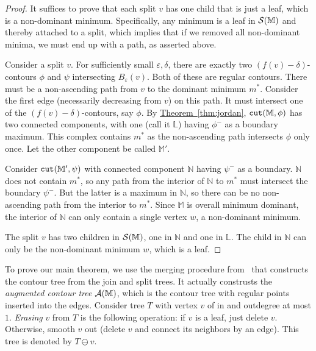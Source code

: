 \documentclass[11pt]{article}
\theoremstyle{definition}
\newcommand{\cA}{{\cal A}}
\newcommand{\cS}{{\cal S}}
\newcommand{\LL}{\mathbb{L}}
\newcommand{\MM}{\mathbb{M}}
\newcommand{\NN}{\mathbb{N}}
\newcommand{\eps}{\varepsilon}
\newcommand{\Thm}[1]{\hyperref[thm:#1]{Theorem~\ref*{thm:#1}}} %
\newcommand{\cut}{{\tt cut}}
\begin{document}
\begin{proof} It suffices to prove that each split $v$ has one child that is just a leaf, which
is a non-dominant minimum.  Specifically, any minimum is a leaf in $\cS(\MM)$ and thereby attached to a split, 
which implies that if we removed all non-dominant minima, we must end up with a path, as asserted above.

Consider a split $v$. For sufficiently small $\eps, \delta$, there are exactly two $(f(v) - \delta)$-contours
$\phi$ and $\psi$ intersecting $B_\eps(v)$. Both of these are regular contours. There must be a non-ascending
path from $v$ to the dominant minimum $m^*$. Consider the first edge (necessarily decreasing from $v$)
on this path. It must intersect one of the $(f(v) - \delta)$-contours, say $\phi$. By \Thm{jordan}, $\cut(\MM,\phi)$ has
two connected components, with one (call it $\LL$) having $\phi^-$ as a boundary maximum. This complex
contains $m^*$ as the non-ascending path intersects $\phi$ only once. Let the other
component be called $\MM'$.

Consider $\cut(\MM',\psi)$ with connected component $\NN$ having $\psi^-$ as a boundary. $\NN$
does not contain $m^*$, so any path from the interior of $\NN$ to $m^*$ must intersect the boundary $\psi^-$.
But the latter is a maximum in $\NN$, so there can be no non-ascending path from the interior to $m^*$.
Since $\MM$ is overall minimum dominant, the interior of $\NN$ can only contain a single vertex $w$, a non-dominant
minimum.

The split $v$ has two children in $\cS(\MM)$, one in $\NN$ and one in $\LL$. The child in $\NN$ can only
be the non-dominant minimum $w$, which is a leaf. 
\end{proof}


To prove our main theorem, we use the merging procedure from~\cite{csa-cctad-00} that constructs the contour tree
from the join and split trees. 
It actually construsts the \emph{augmented contour tree} $\cA(\MM)$, which
is the contour tree with regular points inserted into the edges. 
Consider tree $T$ with vertex $v$ of in and outdegree at most $1$.
\emph{Erasing} $v$ from $T$ is the following operation: if $v$ is a leaf, just delete $v$. Otherwise, smooth $v$ out
(delete $v$ and connect its neighbors by an edge). This tree is denoted by $T \ominus v$.
\end{document}
